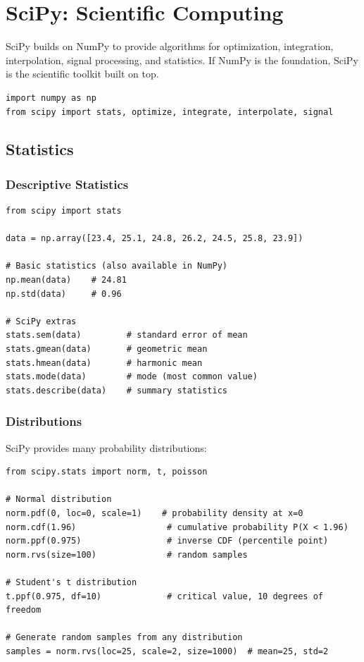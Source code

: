 
\chapter{SciPy: Scientific Computing}
\label{chap:scipy}

SciPy builds on NumPy to provide algorithms for optimization, integration, interpolation, signal processing, and statistics. If NumPy is the foundation, SciPy is the scientific toolkit built on top.

\begin{lstlisting}
import numpy as np
from scipy import stats, optimize, integrate, interpolate, signal
\end{lstlisting}

\section{Statistics}
\label{sec:scipy-stats}

\subsection{Descriptive Statistics}

\begin{lstlisting}
from scipy import stats

data = np.array([23.4, 25.1, 24.8, 26.2, 24.5, 25.8, 23.9])

# Basic statistics (also available in NumPy)
np.mean(data)    # 24.81
np.std(data)     # 0.96

# SciPy extras
stats.sem(data)         # standard error of mean
stats.gmean(data)       # geometric mean
stats.hmean(data)       # harmonic mean
stats.mode(data)        # mode (most common value)
stats.describe(data)    # summary statistics
\end{lstlisting}

\subsection{Distributions}

SciPy provides many probability distributions:

\begin{lstlisting}
from scipy.stats import norm, t, poisson

# Normal distribution
norm.pdf(0, loc=0, scale=1)    # probability density at x=0
norm.cdf(1.96)                  # cumulative probability P(X < 1.96)
norm.ppf(0.975)                 # inverse CDF (percentile point)
norm.rvs(size=100)              # random samples

# Student's t distribution
t.ppf(0.975, df=10)             # critical value, 10 degrees of freedom

# Generate random samples from any distribution
samples = norm.rvs(loc=25, scale=2, size=1000)  # mean=25, std=2
\end{lstlisting}

